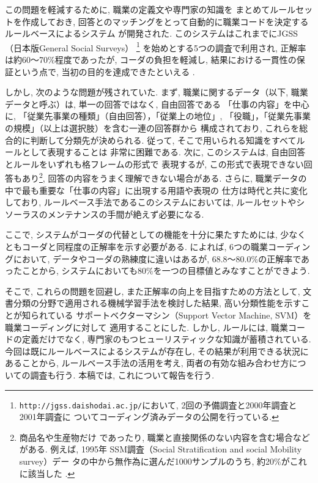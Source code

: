 \documentclass{nlp}
\begin{document}
この問題を軽減するために, 職業の定義文や専門家の知識を
まとめてルールセットを作成しておき, 
回答とのマッチングをとって自動的に職業コードを決定するルールベースによるシステム
が開発された\cite{Takahashi00}. 
このシステムはこれまでにJGSS（日本版General Social Surveys）
\footnote{ 
{\tt http://jgss.daishodai.ac.jp/}において, 2回の予備調査と2000年調査と2001年調査に
ついてコーディング済みデータの公開を行っている. }
を始めとする5つの調査で利用され\cite{Takahashi01,Takahashi02a,Takahashi02b,Takahashi03}, 
正解率は約60〜70$\%$程度であったが, コーダの負担を軽減し, 
結果における一貫性の保証という点で, 当初の目的を達成できたといえる
. 

しかし, 次のような問題が残されていた. 
まず, 職業に関するデータ（以下, 職業データと呼ぶ）は, 
単一の回答ではなく, 自由回答である
「仕事の内容」を中心に, 「従業先事業の種類」（自由回答），「従業上の地位」,
「役職」，「従業先事業の規模」（以上は選択肢）を含む一連の回答群から
構成されており, 
これらを総合的に判断して分類先が決められる\cite{95SSM96}. 
従って, そこで用いられる知識をすべてルールとして表現することは
非常に困難である. 
次に, このシステムは, 自由回答とルールをいずれも格フレームの形式で
表現するが, この形式で表現できない回答もあり\footnote{商品名や生産物だけ
であったり, 職業と直接関係のない内容を含む場合などがある. 例えば, 1995年
SSM調査（Social Stratification and social Mobility survey）デー
タの中から無作為に選んだ1000サンプルのうち, 約20$\%$がこれに該当した
\cite{Takahashi00}. }, 
回答の内容をうまく理解できない場合がある. 
さらに, 職業データの中で最も重要な「仕事の内容」に出現する用語や表現の
仕方は時代と共に変化しており, 
ルールベース手法であるこのシステムにおいては, 
ルールセットやシソーラスのメンテナンスの手間が絶えず必要になる. 

ここで, 
システムがコーダの代替としての機能を十分に果たすためには, 
少なくともコーダと同程度の正解率を示す必要がある. 
\cite{Takahashi01,Takahashi02a}によれば, 
6つの職業コーディングにおいて, 
データやコーダの熟練度に違いはあるが, 68.8〜80.0$\%$の正解率であったことから, 
システムにおいても80$\%$を一つの目標値とみなすことができよう. 

そこで, これらの問題を回避し, 
また正解率の向上を目指すための方法として, 
文書分類の分野で適用される機械学習手法を検討した結果,  
高い分類性能を示すことが知られている\cite{Joachims98,Dumais_et_al98,Taira00,Sebastiani02}
サポートベクターマシン（Support Vector Machine, SVM）を職業コーディングに対して
適用することにした. 
しかし, ルールには, 職業コードの定義だけでなく, 
専門家のもつヒューリスティックな知識が蓄積されている. 
今回は既にルールベースによるシステムが存在し, 
その結果が利用できる状況にあることから, 
ルールベース手法の活用を考え, 
両者の有効な組み合わせ方についての調査も行う. 
本稿では, これについて報告を行う. 
\end{document}
